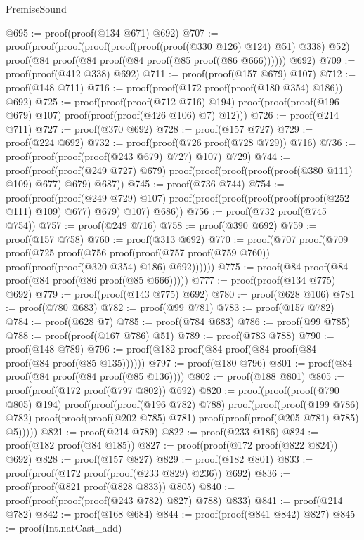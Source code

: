 \begin{lexlean}{PremiseSound}
\begin{coremodule}
@695 := proof(proof(@134 @671) @692)
@707 := proof(proof(proof(proof(proof(proof(proof(@330 @126) @124) @51) @338) @52)
        proof(@84 proof(@84 proof(@84 proof(@85 proof(@86 @666))))))
      @692)
@709 := proof(proof(@412 @338) @692)
@711 := proof(proof(@157 @679) @107)
@712 := proof(@148 @711)
@716 := proof(proof(@172 proof(proof(@180 @354) @186)) @692)
@725 := proof(proof(proof(@712 @716) @194)
      proof(proof(proof(@196 @679) @107) proof(proof(proof(@426 @106) @7) @12)))
@726 := proof(@214 @711)
@727 := proof(@370 @692)
@728 := proof(@157 @727)
@729 := proof(@224 @692)
@732 := proof(proof(@726 proof(@728 @729)) @716)
@736 := proof(proof(proof(proof(@243 @679) @727) @107) @729)
@744 := proof(proof(proof(@249 @727) @679)
      proof(proof(proof(proof(proof(@380 @111) @109) @677) @679) @687))
@745 := proof(@736 @744)
@754 := proof(proof(proof(@249 @729) @107)
      proof(proof(proof(proof(proof(proof(@252 @111) @109) @677) @679) @107) @686))
@756 := proof(@732 proof(@745 @754))
@757 := proof(@249 @716)
@758 := proof(@390 @692)
@759 := proof(@157 @758)
@760 := proof(@313 @692)
@770 := proof(@707
      proof(@709
          proof(@725
              proof(@756
                  proof(proof(@757 proof(@759 @760)) proof(proof(proof(@320 @354) @186) @692))))))
@775 := proof(@84 proof(@84 proof(@84 proof(@86 proof(@85 @666)))))
@777 := proof(proof(@134 @775) @692)
@779 := proof(proof(@143 @775) @692)
@780 := proof(@628 @106)
@781 := proof(@780 @683)
@782 := proof(@99 @781)
@783 := proof(@157 @782)
@784 := proof(@628 @7)
@785 := proof(@784 @683)
@786 := proof(@99 @785)
@788 := proof(proof(@167 @786) @51)
@789 := proof(@783 @788)
@790 := proof(@148 @789)
@796 := proof(@182 proof(@84 proof(@84 proof(@84 proof(@84 proof(@85 @135))))))
@797 := proof(@180 @796)
@801 := proof(@84 proof(@84 proof(@84 proof(@85 @136))))
@802 := proof(@188 @801)
@805 := proof(proof(@172 proof(@797 @802)) @692)
@820 := proof(proof(proof(@790 @805) @194)
      proof(proof(proof(@196 @782) @788)
          proof(proof(proof(@199 @786) @782)
              proof(proof(proof(@202 @785) @781) proof(proof(proof(@205 @781) @785) @5)))))
@821 := proof(@214 @789)
@822 := proof(@233 @186)
@824 := proof(@182 proof(@84 @185))
@827 := proof(proof(@172 proof(@822 @824)) @692)
@828 := proof(@157 @827)
@829 := proof(@182 @801)
@833 := proof(proof(@172 proof(proof(@233 @829) @236)) @692)
@836 := proof(proof(@821 proof(@828 @833)) @805)
@840 := proof(proof(proof(proof(@243 @782) @827) @788) @833)
@841 := proof(@214 @782)
@842 := proof(@168 @684)
@844 := proof(proof(@841 @842) @827)
@845 := proof(Int.natCast_add)

\end{coremodule}
\end{lexlean}
